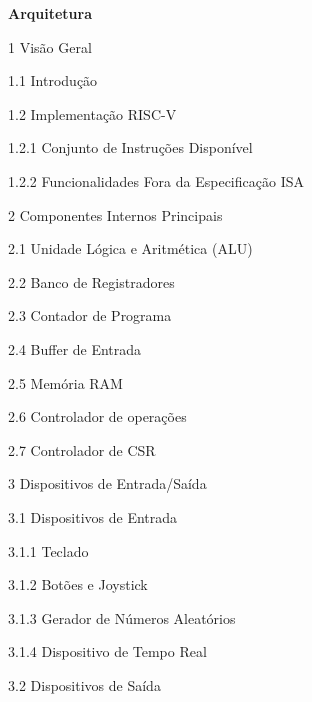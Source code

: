 \documentclass[
	12pt,				%
	openright,			%
	oneside,			%
	a4paper,			%
	english,			%
	french,				%
	spanish,			%
	brazil,				%
	]{abntex2}
\newenvironment{boxedsmall}{%
  \begin{framed}\small
  \begin{minipage}{\dimexpr\linewidth-2\fboxsep-2\fboxrule}
}{%
  \end{minipage}
  \end{framed}
}
\begin{document}
\begin{boxedsmall}\label{sumario-wiki}
\textbf{Arquitetura}

\hspace*{1em}1 Visão Geral

\hspace*{2em}1.1 Introdução

\hspace*{2em}1.2 Implementação RISC-V

\hspace*{3em}1.2.1 Conjunto de Instruções Disponível

\hspace*{3em}1.2.2 Funcionalidades Fora da Especificação ISA

\hspace*{1em}2 Componentes Internos Principais

\hspace*{2em}2.1 Unidade Lógica e Aritmética (ALU)

\hspace*{2em}2.2 Banco de Registradores

\hspace*{2em}2.3 Contador de Programa

\hspace*{2em}2.4 Buffer de Entrada

\hspace*{2em}2.5 Memória RAM

\hspace*{2em}2.6 Controlador de operações

\hspace*{2em}2.7 Controlador de CSR

\hspace*{1em}3 Dispositivos de Entrada/Saída

\hspace*{2em}3.1 Dispositivos de Entrada

\hspace*{3em}3.1.1 Teclado

\hspace*{3em}3.1.2 Botões e Joystick

\hspace*{3em}3.1.3 Gerador de Números Aleatórios

\hspace*{3em}3.1.4 Dispositivo de Tempo Real

\hspace*{2em}3.2 Dispositivos de Saída


\end{boxedsmall}
\end{document}
